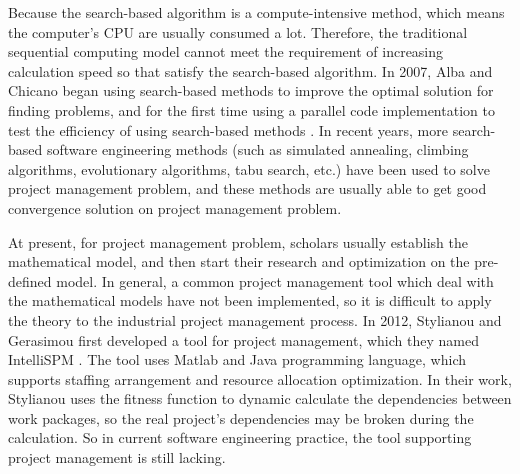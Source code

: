Because the search-based algorithm is a compute-intensive method, which means
the computer's CPU are usually consumed a lot. Therefore, the traditional
sequential computing model cannot meet the requirement of increasing
calculation speed so that satisfy the search-based algorithm. In 2007, Alba and
Chicano began using search-based methods to improve the optimal solution for
finding problems, and for the first time using a parallel code implementation to
test the efficiency of using search-based methods \cite{pospichal}.  In recent
years, more search-based software engineering methods (such as simulated
annealing, climbing algorithms, evolutionary algorithms, tabu search, etc.) have
been used to solve project management problem, and these methods are usually
able to get good convergence solution on project management problem.


At present, for project management problem, scholars usually establish the
mathematical model, and then start their research and optimization on the
pre-defined model. In general, a common project management tool which deal with
the mathematical models have not been implemented, so it is difficult to apply
the theory to the industrial project management process. In 2012, Stylianou and
Gerasimou first developed a tool for project management, which they named
IntelliSPM \cite{stylianou}. The tool uses Matlab and Java programming language,
which supports staffing arrangement and resource allocation optimization. In
their work, Stylianou uses the fitness function to dynamic calculate the
dependencies between work packages, so the real project's dependencies may be
broken during the calculation. So in current software engineering practice, the
tool supporting project management is still lacking.



